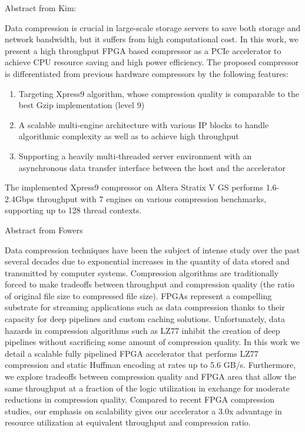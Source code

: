 \documentclass[dvipdfm]{book}
\begin{document}
Abstract from Kim\cite{16}:

Data compression is crucial in large-scale storage servers to save
both storage and network bandwidth, but it suffers from high
computational cost. In this work, we present a high throughput FPGA
based compressor as a PCIe accelerator to achieve CPU resource saving
and high power efficiency. The proposed compressor is differentiated
from previous hardware compressors by the following features:
\begin{enumerate}
\item Targeting Xpress9 algorithm, whose compression quality is comparable 
to the best Gzip implementation (level 9)
\item A scalable multi-engine architecture with various IP blocks to handle
algorithmic complexity as well as to achieve high throughput
\item Supporting a heavily multi-threaded server environment with an 
asynchronous data transfer interface between the host and the accelerator
\end{enumerate}

The implemented Xpress9 compressor on Altera Stratix V GS performs 1.6-2.4Gbps
throughput with 7 engines on various compression benchmarks, 
supporting up to 128 thread contexts.

Abstract from Fowers\cite{17}

Data compression techniques have been the subject of intense study
over the past several decades due to exponential increases in the
quantity of data stored and transmitted by computer
systems. Compression algorithms are traditionally forced to make
tradeoffs between throughput and compression quality (the ratio of
original file size to compressed file size). FPGAs represent a
compelling substrate for streaming applications such as data
compression thanks to their capacity for deep pipelines and custom
caching solutions. Unfortunately, data hazards in compression
algorithms such as LZ77 inhibit the creation of deep pipelines
without sacrificing some amount of compression quality. In this work
we detail a scalable fully pipelined FPGA accelerator that performs
LZ77 compression and static Huffman encoding at rates up to 5.6
GB/s. Furthermore, we explore tradeoffs between compression quality
and FPGA area that allow the same throughput at a fraction of the
logic utilization in exchange for moderate reductions in compression
quality. Compared to recent FPGA compression studies, our emphasis on
scalability gives our accelerator a 3.0x advantage in resource
utilization at equivalent throughput and compression ratio.
\end{document}
